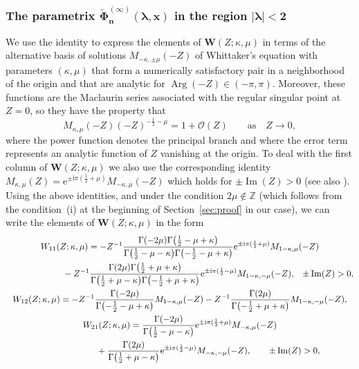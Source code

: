 \documentclass[11pt]{article}
\numberwithin{equation}{section}
\numberwithin{equation}{section}
\newcommand{\ee}{\mathrm{e}}
\newcommand{\ii}{\mathrm{i}}
\newcommand{\para}[1]{\breve{#1}}
\newcommand{\Z}{{\mathbb{Z}}}
\newcommand{\im}{\operatorname{Im}}
\renewcommand{\arg}{\operatorname{Arg}}
\begin{document}
\subsubsection[The parametrix Phi\^(infty)\_n(lambda,x) in the region lambda less than 2 in absolute value]{The parametrix $\boldsymbol{\para{\boldsymbol{\Phi}}^{(\infty)}_n(\lambda,x)}$ in the region $\boldsymbol{|\lambda|<2}$}

We use the identity \cite[equation~(13.14.33)]{DLMF} to express the elements of $\mathbf{W}(Z;\kappa,\mu)$ in terms of the alternative basis of solutions $M_{-\kappa,\pm\mu}(-Z)$ of Whittaker's equation with parameters $(\kappa,\mu)$ that form a numerically satisfactory pair in a neighborhood of the origin and that are analytic for $\arg(-Z)\in (-\pi,\pi)$. Moreover, these functions are the Maclaurin series associated with the regular singular point at $Z=0$, so they have the property that
\begin{equation}
M_{\kappa,\mu}(-Z)(-Z)^{-\frac{1}{2}-\mu} = 1+\mathcal{O}(Z) \qquad \text{as} \quad Z\to 0,
\label{eq:WhittakerM-near-origin}
\end{equation}
where the power function denotes the principal branch and where the error term represents an analytic function of $Z$ vanishing at the origin. To deal with the first column of $\mathbf{W}(Z;\kappa,\mu)$ we also use the corresponding identity $M_{\kappa,\mu}(Z)=\ee^{\pm \ii\pi(\frac{1}{2}+\mu)}M_{-\kappa,\mu}(-Z)$ which holds for $\pm\im(Z)>0$ (see also \cite[equation~(13.14.10)]{DLMF}).
Using the above identities, and under the condition $2\mu \not \in \Z$ (which follows from the condition~(i) at the beginning of Section~\ref{sec:proof} in our case), we can write the elements of $\mathbf{W}(Z;\kappa,\mu)$ in the form
\begin{gather*}\nonumber
 W_{11}(Z;\kappa,\mu)= -Z^{-1}\frac{\Gamma(-2\mu)\Gamma\big(\frac{1}{2}-\mu+\kappa\big)}{\Gamma\big(\frac{1}{2}-\mu-\kappa\big)\Gamma\bigl(-\frac{1}{2}-\mu+\kappa\bigr)}\ee^{\pm \ii\pi(\frac{1}{2}+\mu)}M_{1-\kappa,\mu}(-Z)\\
\hphantom{W_{11}(Z;\kappa,\mu)=}{}
-Z^{-1}\frac{\Gamma(2\mu)\Gamma\big(\frac{1}{2}+\mu+\kappa\big)}{\Gamma\big(\frac{1}{2}+\mu-\kappa\big)\Gamma\bigl(-\frac{1}{2}+\mu+\kappa\bigr)}
\ee^{\pm \ii\pi(\frac{1}{2}-\mu)}M_{1-\kappa,-\mu}(-Z),\quad\! \pm\im(Z)>0,\\
 W_{12}(Z;\kappa,\mu)= -Z^{-1}\frac{\Gamma(-2\mu)}{\Gamma\bigl(-\frac{1}{2}-\mu+\kappa\bigr)}M_{1-\kappa,\mu}(-Z)-Z^{-1}\frac{\Gamma(2\mu)}{\Gamma\bigl({-}\frac{1}{2}+\mu+\kappa\bigr)}M_{1-\kappa,-\mu}(-Z),\\
 W_{21}(Z;\kappa,\mu)= \frac{\Gamma(-2\mu)}{\Gamma\big(\frac{1}{2}-\mu-\kappa\big)}\ee^{\pm \ii\pi (\frac{1}{2}+\mu)}M_{-\kappa,\mu}(-Z)\\
 \hphantom{W_{21}(Z;\kappa,\mu)= }{}
 +
 \frac{\Gamma(2\mu)}{\Gamma\big(\frac{1}{2}+\mu-\kappa\big)}\ee^{\pm \ii\pi(\frac{1}{2}-\mu)}M_{-\kappa,-\mu}(-Z),\qquad\pm\im(Z)>0,
\end{gather*}%
\end{document}

